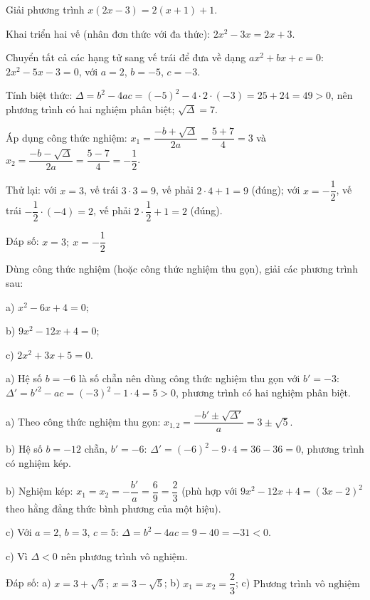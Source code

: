 \begin{problem}[9DS-PT2-002]
Giải phương trình $x(2x - 3) = 2(x + 1) + 1$.

\begin{solution}
Khai triển hai vế (nhân đơn thức với đa thức): $2x^2 - 3x = 2x + 3$.

Chuyển tất cả các hạng tử sang vế trái để đưa về dạng $ax^2 + bx + c = 0$: $2x^2 - 5x - 3 = 0$, với $a = 2$, $b = -5$, $c = -3$.

Tính biệt thức: $\Delta = b^2 - 4ac = (-5)^2 - 4 \cdot 2 \cdot (-3) = 25 + 24 = 49 > 0$, nên phương trình có hai nghiệm phân biệt; $\sqrt{\Delta} = 7$.

Áp dụng công thức nghiệm: $x_1 = \dfrac{-b + \sqrt{\Delta}}{2a} = \dfrac{5 + 7}{4} = 3$ và $x_2 = \dfrac{-b - \sqrt{\Delta}}{2a} = \dfrac{5 - 7}{4} = -\dfrac{1}{2}$.

Thử lại: với $x = 3$, vế trái $3 \cdot 3 = 9$, vế phải $2 \cdot 4 + 1 = 9$ (đúng); với $x = -\dfrac{1}{2}$, vế trái $-\dfrac{1}{2} \cdot (-4) = 2$, vế phải $2 \cdot \dfrac{1}{2} + 1 = 2$ (đúng).

Đáp số: $\boxed{x = 3;\ x = -\dfrac{1}{2}}$
\end{solution}
\end{problem}

\begin{problem}[9DS-PT2-003]
Dùng công thức nghiệm (hoặc công thức nghiệm thu gọn), giải các phương trình sau:

a) $x^2 - 6x + 4 = 0$;

b) $9x^2 - 12x + 4 = 0$;

c) $2x^2 + 3x + 5 = 0$.

\begin{solution}
a) Hệ số $b = -6$ là số chẵn nên dùng công thức nghiệm thu gọn với $b' = -3$: $\Delta' = b'^2 - ac = (-3)^2 - 1 \cdot 4 = 5 > 0$, phương trình có hai nghiệm phân biệt.

a) Theo công thức nghiệm thu gọn: $x_{1,2} = \dfrac{-b' \pm \sqrt{\Delta'}}{a} = 3 \pm \sqrt{5}$.

b) Hệ số $b = -12$ chẵn, $b' = -6$: $\Delta' = (-6)^2 - 9 \cdot 4 = 36 - 36 = 0$, phương trình có nghiệm kép.

b) Nghiệm kép: $x_1 = x_2 = -\dfrac{b'}{a} = \dfrac{6}{9} = \dfrac{2}{3}$ (phù hợp với $9x^2 - 12x + 4 = (3x - 2)^2$ theo hằng đẳng thức bình phương của một hiệu).

c) Với $a = 2$, $b = 3$, $c = 5$: $\Delta = b^2 - 4ac = 9 - 40 = -31 < 0$.

c) Vì $\Delta < 0$ nên phương trình vô nghiệm.

Đáp số: a) $\boxed{x = 3 + \sqrt{5};\ x = 3 - \sqrt{5}}$; b) $\boxed{x_1 = x_2 = \dfrac{2}{3}}$; c) $\boxed{\text{Phương trình vô nghiệm}}$
\end{solution}
\end{problem}

